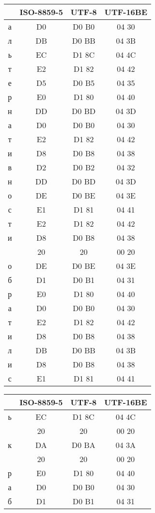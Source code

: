 \begin{center}
\begin{tabular}{|c|c|c|c|}
\hline
\end{tabular}
\quad
\begin{tabular}{|c|c|c|c|}
	\hline
	& ISO-8859-5 & UTF-8 & UTF-16BE\\
	\hline
	а & D0 & D0 B0 & 04 30\\
	л & DB & D0 BB & 04 3B\\
	ь & EC & D1 8C & 04 4C\\
	т & E2 & D1 82 & 04 42\\
	е & D5 & D0 B5 & 04 35\\
	р & E0 & D1 80 & 04 40\\
	н & DD & D0 BD & 04 3D\\
	а & D0 & D0 B0 & 04 30\\
	т & E2 & D1 82 & 04 42\\
	и & D8 & D0 B8 & 04 38\\
	в & D2 & D0 B2 & 04 32\\
	н & DD & D0 BD & 04 3D\\
	о & DE & D0 BE & 04 3E\\
	с & E1 & D1 81 & 04 41\\
	т & E2 & D1 82 & 04 42\\
	и & D8 & D0 B8 & 04 38\\
	& 20 & 20 & 00 20\\
	о & DE & D0 BE & 04 3E\\
	б & D1 & D0 B1 & 04 31\\
	р & E0 & D1 80 & 04 40\\
	а & D0 & D0 B0 & 04 30\\
	т & E2 & D1 82 & 04 42\\
	и & D8 & D0 B8 & 04 38\\
	л & DB & D0 BB & 04 3B\\
	и & D8 & D0 B8 & 04 38\\
	с & E1 & D1 81 & 04 41\\ 
	\hline
\end{tabular}
\quad
\begin{tabular}{|c|c|c|c|}
	\hline
	& ISO-8859-5 & UTF-8 & UTF-16BE\\
	\hline
	ь & EC & D1 8C & 04 4C\\
	& 20 & 20 & 00 20\\
	к & DA & D0 BA & 04 3A\\
	& 20 & 20 & 00 20\\
	р & E0 & D1 80 & 04 40\\
	а & D0 & D0 B0 & 04 30\\
	б & D1 & D0 B1 & 04 31\\

\end{tabular}
\end{center}
